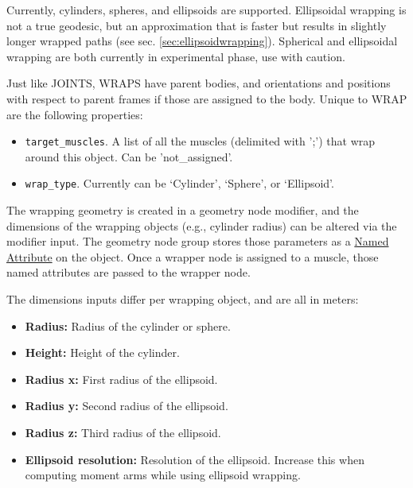 \documentclass{article}
\begin{document}
Currently, cylinders, spheres, and ellipsoids are supported. Ellipsoidal wrapping is not a true geodesic, but an approximation that is faster but results in slightly longer wrapped paths (see sec. \ref{sec:ellipsoidwrapping}). Spherical and ellipsoidal wrapping are both currently in experimental phase, use with caution.

Just like JOINTS, WRAPS have parent bodies, and orientations and positions with respect to parent frames if those are assigned to the body. Unique to WRAP are the following properties:

\begin{itemize}
    \item \texttt{target\_muscles}. A list of all the muscles (delimited with ';') that wrap around this object. Can be 'not\_assigned'.
    \item \texttt{wrap\_type}. Currently can be `Cylinder', `Sphere', or `Ellipsoid'.
\end{itemize}

The wrapping geometry is created in a geometry node modifier, and the dimensions of the wrapping objects (e.g., cylinder radius) can be altered via the modifier input. The geometry node group stores those parameters as a \href{https://docs.blender.org/manual/en/latest/modeling/geometry_nodes/geometry/read/named_attribute.html}{Named Attribute} on the object. Once a wrapper node is assigned to a muscle, those named attributes are passed to the wrapper node.

The dimensions inputs differ per wrapping object, and are all in meters:

\begin{itemize}
\item \textbf{Radius:} Radius of the cylinder or sphere.
\item \textbf{Height:} Height of the cylinder.
\item \textbf{Radius x:} First radius of the ellipsoid.
\item \textbf{Radius y:} Second radius of the ellipsoid.
\item \textbf{Radius z:} Third radius of the ellipsoid.
\item \textbf{Ellipsoid resolution:} Resolution of the ellipsoid. Increase this when computing moment arms while using ellipsoid wrapping.
\end{itemize}


\appendix
\end{document}
